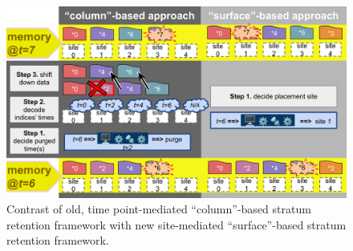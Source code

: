 \begin{figure}
  \centering
  \includegraphics[width=\linewidth]{img/surf-vs-column-schematic}
  \caption{Contrast of old, time point-mediated ``column''-based stratum retention framework with new site-mediated ``surface''-based stratum retention framework.}
  \label{fig:surf-vs-column-schematic}
\end{figure}
